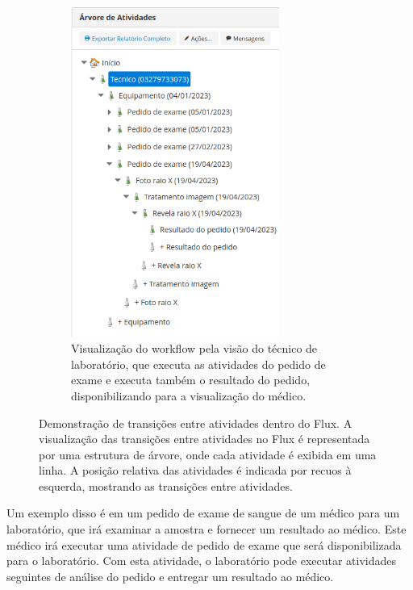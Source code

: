 \begin{figure}
\begin{subfigure}[b]{0.45\textwidth}
        \includegraphics[width=0.75\textwidth]{imgs/Exemplo-Mestrado/arvore_tecnico.png}
        \caption{Visualização do workflow pela visão do técnico de laboratório, que executa as atividades do pedido de exame e executa também o resultado do pedido, disponibilizando para a visualização do médico.}
        \label{fig:arvore_tecnico}
    \end{subfigure}
    \caption{Demonstração de transições entre atividades dentro do Flux. A visualização das transições entre atividades no Flux é representada por uma estrutura de árvore, onde cada atividade é exibida em uma linha. A posição relativa das atividades é indicada por recuos à esquerda, mostrando as transições entre atividades.}
    \label{fig:arvore_medico_tecnico}

\end{figure}

Um exemplo disso é em um pedido de exame de sangue de um médico para um laboratório, que irá examinar a amostra e fornecer um resultado ao médico. Este médico irá executar uma atividade de pedido de exame que será disponibilizada para o laboratório. Com esta atividade, o laboratório pode executar atividades seguintes de análise do pedido e entregar um resultado ao médico.

